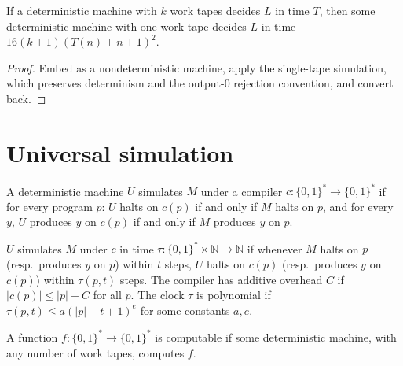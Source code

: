 \begin{theorem}
  \label{thm:models-single-tape}
  \leanok
  If a deterministic machine with $k$ work tapes decides $L$ in time $T$, then
  some deterministic machine with one work tape decides $L$ in time
  $16(k+1)(T(n) + n + 1)^2$.
\end{theorem}
\begin{proof}
  \leanok
  Embed as a nondeterministic machine, apply the single-tape simulation, which
  preserves determinism and the output-$0$ rejection convention, and convert
  back.
\end{proof}

\section{Universal simulation}

\begin{definition}[Simulation]
  \label{def:simulates}
  \leanok
  A deterministic machine $U$ simulates $M$ under a compiler
  $c : \{0,1\}^* \to \{0,1\}^*$ if for every program $p$: $U$ halts on $c(p)$
  if and only if $M$ halts on $p$, and for every $y$, $U$ produces $y$ on $c(p)$
  if and only if $M$ produces $y$ on $p$.
\end{definition}

\begin{definition}
  \label{def:models-simulates-in-time}
  \leanok
  $U$ simulates $M$ under $c$ in time $\tau : \{0,1\}^* \times \mathbb{N} \to \mathbb{N}$
  if whenever $M$ halts on $p$ (resp.\ produces $y$ on $p$) within $t$ steps,
  $U$ halts on $c(p)$ (resp.\ produces $y$ on $c(p)$) within $\tau(p, t)$ steps.
  The compiler has additive overhead $C$ if $|c(p)| \le |p| + C$ for all $p$.
  The clock $\tau$ is polynomial if $\tau(p, t) \le a (|p| + t + 1)^e$ for
  some constants $a, e$.
\end{definition}

\begin{definition}
  \label{def:computable}
  \leanok
  A function $f : \{0,1\}^* \to \{0,1\}^*$ is computable if some deterministic
  machine, with any number of work tapes, computes $f$.
\end{definition}

